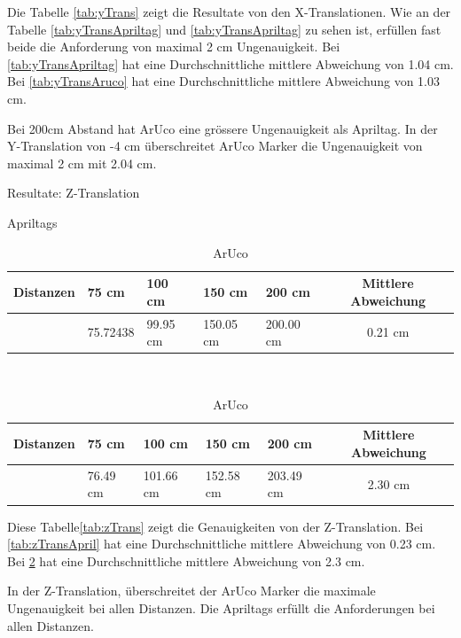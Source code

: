 Die Tabelle \ref{tab:yTrans} zeigt die Resultate von den X-Translationen. 
Wie an der Tabelle \ref{tab:yTransApriltag} und \ref{tab:yTransApriltag} zu sehen ist, erfüllen fast beide die Anforderung von maximal 2 cm Ungenauigkeit.
Bei \ref{tab:yTransApriltag} hat eine Durchschnittliche mittlere Abweichung von 1.04 cm. 
Bei \ref{tab:yTransAruco} hat eine Durchschnittliche mittlere Abweichung von 1.03 cm.

Bei 200cm Abstand hat ArUco eine grössere Ungenauigkeit als Apriltag. 
In der Y-Translation von -4 cm überschreitet ArUco Marker die Ungenauigkeit von maximal 2 cm mit 2.04 cm. 

\begin{table}[!htb]
    \caption{Resultate: Z-Translation}
    \label{tab:zTrans}
    \begin{subtable}{.5\linewidth}
        \caption{Apriltags}
        \label{tab:zTransApril}
        \begin{tabular}{|l|l|l|l|l|c|}
            \hline
            Distanzen & 75 cm & 100 cm & 150 cm & 200 cm &  Mittlere Abweichung\\
            \hline
            &75.72438 & 99.95 cm & 150.05 cm & 200.00 cm & 0.21 cm\\
            \hline
        \end{tabular}
    \end{subtable}
    \\[\smallskipamount]
    \begin{subtable}{.5\linewidth}
        \caption{ArUco}
        \label{tab:zTransAruco}
        \begin{tabular}{|l|l|l|l|l|c|}
            \hline
            Distanzen & 75 cm & 100 cm & 150 cm & 200 cm  &  Mittlere Abweichung \\
            \hline
            & 76.49 cm & 101.66 cm & 152.58 cm & 203.49 cm & 2.30 cm\\
            \hline
        \end{tabular}
    \end{subtable} 
\end{table}

Diese Tabelle\ref{tab:zTrans} zeigt die Genauigkeiten von der Z-Translation.
Bei \ref{tab:zTransApril} hat eine Durchschnittliche mittlere Abweichung von 0.23 cm. 
Bei \ref{tab:zTransAruco} hat eine Durchschnittliche mittlere Abweichung von 2.3 cm.

In der Z-Translation, überschreitet der ArUco Marker die maximale Ungenauigkeit bei allen Distanzen.
Die Apriltags erfüllt die Anforderungen bei allen Distanzen.



